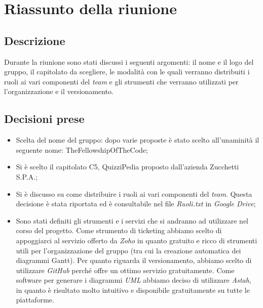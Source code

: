 \section{Riassunto della riunione}
\subsection{Descrizione}

Durante la riunione sono stati discussi i seguenti argomenti: il nome e il logo del gruppo, il capitolato da scegliere, le modalità con le quali verranno distribuiti i ruoli ai vari componenti del \textit{team} e gli strumenti che verranno utilizzati per l'organizzazione e il versionamento.

\subsection{Decisioni prese}
\begin{itemize}
\item Scelta del nome del gruppo: dopo varie proposte è stato scelto all'unaminità il seguente nome: TheFellowshipOfTheCode;
\item Si è scelto il capitolato C5, QuizziPedia proposto dall'azienda Zucchetti S.P.A.;
\item Si è discusso su come distribuire i ruoli ai vari componenti del \textit{team}. Questa decisione è stata riportata ed è consultabile nel file \textsl{Ruoli.txt} in \textit{Google Drive};
\item Sono stati definiti gli strumenti e i servizi che si andranno ad utilizzare nel corso del progetto. Come strumento di ticketing abbiamo scelto di appoggiarci al servizio offerto da \textit{Zoho} in quanto gratuito e ricco di strumenti utili per l'organizzazione del gruppo (tra cui la creazione automatica dei diagrammi Gantt). Per quanto riguarda il versionamento, abbiamo scelto di utilizzare \textit{GitHub} perché offre un ottimo servizio gratuitamente. Come software per generare i diagrammi \textit{UML} abbiamo deciso di utilizzare \textit{Astah}, in quanto è risultato molto intuitivo e disponibile gratuitamente su tutte le piattaforme.
\end{itemize}
